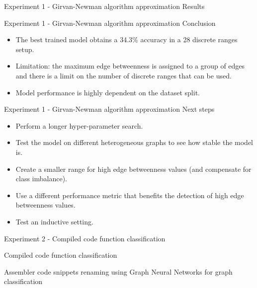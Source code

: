 \documentclass[xcolor=table]{beamer}
\begin{document}
\begin{frame}{Experiment 1 - Girvan-Newman algorithm approximation }{ Results}
\end{frame}




\begin{frame}{Experiment 1 - Girvan-Newman algorithm approximation }{ Conclusion}

\begin{itemize}
    \item The best trained model obtains a 34.3\% accuracy in a 28 discrete ranges setup.
    \item Limitation: the maximum edge betweenness is assigned to a group of edges and there is a limit on the number of discrete ranges that can be used.
    \item Model performance is highly dependent on the dataset split.
\end{itemize}

\end{frame}

\begin{frame}{Experiment 1 - Girvan-Newman algorithm approximation }{ Next steps}

\begin{itemize}
    \item Perform a longer hyper-parameter search.
    \item Test the model on different heterogeneous graphs to see how stable the model is.
    \item Create a smaller range for high edge betweenness values (and compensate for class imbalance).
    \item Use a different performance metric that benefits the detection of high edge betweenness values.
    \item Test an inductive setting.
\end{itemize}
\end{frame}






\begin{frame}{Experiment 2 - Compiled code function classification}{}


\begin{block}
    {
    Compiled code function classification
     }
    {
        Assembler code snippets renaming using Graph Neural Networks for graph classification

    }
\end{block}


\end{frame}
\end{document}
